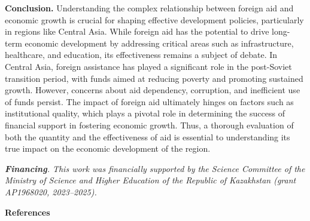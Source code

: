 \begin{multicols}{2}
{\bfseries Conclusion.} Understanding the complex relationship between
foreign aid and economic growth is crucial for shaping effective
development policies, particularly in regions like Central Asia. While
foreign aid has the potential to drive long-term economic development by
addressing critical areas such as infrastructure, healthcare, and
education, its effectiveness remains a subject of debate. In Central
Asia, foreign assistance has played a significant role in the
post-Soviet transition period, with funds aimed at reducing poverty and
promoting sustained growth. However, concerns about aid dependency,
corruption, and inefficient use of funds persist. The impact of foreign
aid ultimately hinges on factors such as institutional quality, which
plays a pivotal role in determining the success of financial support in
fostering economic growth. Thus, a thorough evaluation of both the
quantity and the effectiveness of aid is essential to understanding its
true impact on the economic development of the region.

\emph{{\bfseries Financing}. This work was financially supported by the
Science Committee of the Ministry of Science and Higher Education of the
Republic of Kazakhstan (grant AP1968020, 2023--2025).}
\end{multicols}

\begin{center}
{\bfseries References}
\end{center}

